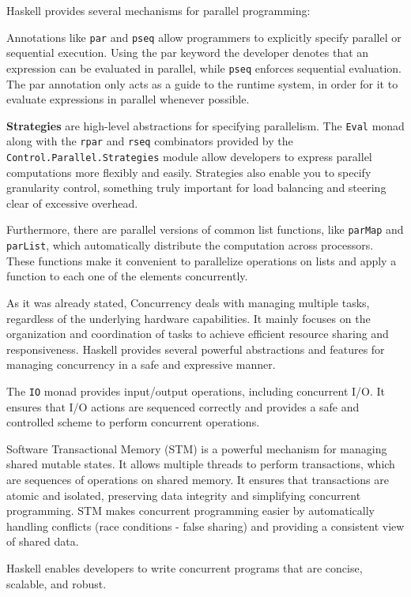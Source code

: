 \documentclass[a4paper, titlepage, twoside]{article}
\begin{document}
Haskell provides several mechanisms for parallel programming:

Annotations like \texttt{par} and \texttt{pseq} allow programmers to explicitly specify parallel or sequential execution. Using the par keyword the developer denotes that an expression can be evaluated in parallel, while \texttt{pseq} enforces sequential evaluation. The par annotation only acts as a guide to the runtime system, in order for it to evaluate expressions in parallel whenever possible.

\textbf{Strategies} are high-level abstractions for specifying parallelism. The \texttt{Eval} monad along with the \texttt{rpar} and \texttt{rseq} combinators provided by the \texttt{Control.Parallel.Strategies} module allow developers to express parallel computations more flexibly and easily. Strategies also enable you to specify granularity control, something truly important for load balancing and steering clear of excessive overhead.

Furthermore, there are parallel versions of common list functions, like \texttt{parMap} and \texttt{parList}, which automatically distribute the computation across processors. These functions make it convenient to parallelize operations on lists and apply a function to each one of the elements concurrently.

As it was already stated, Concurrency deals with managing multiple tasks, regardless of the underlying hardware capabilities. It mainly focuses on the organization and coordination of tasks to achieve efficient resource sharing and responsiveness. Haskell provides several powerful abstractions and features for managing concurrency in a safe and expressive manner.

The \texttt{IO} monad provides input/output operations, including concurrent I/O. It ensures that I/O actions are sequenced correctly and provides a safe and controlled scheme to perform concurrent operations.

Software Transactional Memory (STM) is a powerful mechanism for managing shared mutable states. It allows multiple threads to perform transactions, which are sequences of operations on shared memory. It ensures that transactions are atomic and isolated, preserving data integrity and simplifying concurrent programming. STM makes concurrent programming easier by automatically handling conflicts (race conditions - false sharing) and providing a consistent view of shared data.

Haskell enables developers to write concurrent programs that are concise, scalable, and robust.
\end{document}
